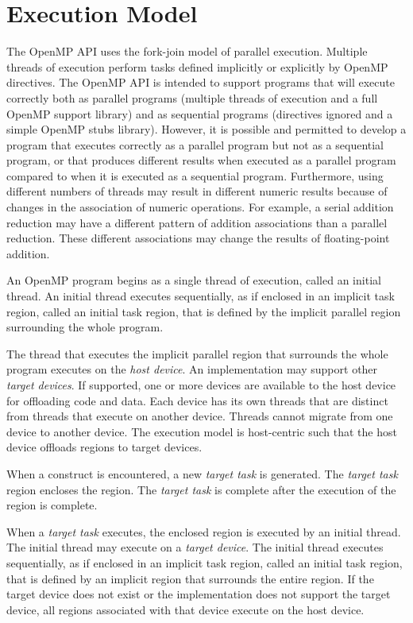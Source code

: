\section{Execution Model}
\label{sec:Execution Model}
The OpenMP API uses the fork-join model of parallel execution. Multiple threads of
execution perform tasks defined implicitly or explicitly by OpenMP directives. The
OpenMP API is intended to support programs that will execute correctly both as parallel
programs (multiple threads of execution and a full OpenMP support library) and as
sequential programs (directives ignored and a simple OpenMP stubs library). However,
it is possible and permitted to develop a program that executes correctly as a parallel
program but not as a sequential program, or that produces different results when 
executed as a parallel program compared to when it is executed as a sequential program. 
Furthermore, using different numbers of threads may result in different numeric results 
because of changes in the association of numeric operations. For example, a serial 
addition reduction may have a different pattern of addition associations than a parallel 
reduction. These different associations may change the results of floating-point addition.

An OpenMP program begins as a single thread of execution, called an initial thread. An 
initial thread executes sequentially, as if enclosed in an implicit task region, called an 
initial task region, that is defined by the implicit parallel region surrounding the whole 
program.

The thread that executes the implicit parallel region that surrounds the whole program 
executes on the \emph{host device}. An implementation may support 
other \emph{target devices}. If
supported, one or more devices are available to the host device for offloading code and 
data. Each device has its own threads that are distinct from threads that execute on 
another device. Threads cannot migrate from one device to another device. The 
execution model is host-centric such that the host device offloads  regions to
target devices.

When a  construct is encountered, a new \emph{target task} is generated.
The \emph{target task} region encloses the  region. The \emph{target task} is 
complete after the execution of the  region is complete.

When a \emph{target task} executes, the enclosed  region is executed by an initial 
thread.  The initial thread may execute on a \emph{target device}.  The initial thread executes 
sequentially, as if enclosed in an implicit task region, called an initial task region, that is 
defined by an implicit  region that surrounds the entire  
region.  If the target device does not exist or the implementation does not support the target 
device, all  regions associated with that device execute on the host device.

